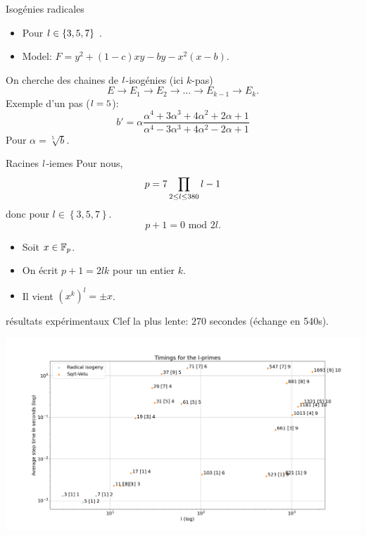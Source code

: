\documentclass{beamer}
\begin{document}
\begin{frame}{Isog\'enies radicales}
	\begin{itemize}
		\item Pour $\mathnormal{l}\in\left\{3, 5, 7\right\}$ .
		\item Model: $		F = y^2 + (1-c)xy - by - x^2(x-b)$.
	\end{itemize}
	On cherche des chaines de $\mathnormal{l}$-isog\'enies (ici $k$-pas)
\[
	E\rightarrow E_1\rightarrow E_2\rightarrow \dots\rightarrow E_{k-1}\rightarrow E_k.
\]
	Exemple d'un pas ($\mathnormal{l}=5$):
\[
	b' = \alpha\frac{\alpha^4 + 3\alpha^3 + 4\alpha^2 + 2\alpha + 1 }{\alpha^4 - 3\alpha^3 + 4\alpha^2 - 2\alpha + 1}
\]
	Pour $\alpha = \sqrt[5]{b}$.
\end{frame}

\begin{frame}[noframenumbering]{Racines $\mathnormal{l}$-iemes}
	Pour nous,
	\[
		p = 7\prod_{2\leq \mathnormal{l}\leq 380} \mathnormal{l} - 1
	\]
	donc pour $l\in\left\{3, 5, 7\right\}$.
	\[
		p + 1 = 0 \text{ mod }  2l.
	\]
	\begin{itemize}
		\item Soit $x\in\mathbb{F}_p$.
		\item On \'ecrit $p+1 = 2lk$ pour un entier $k$.
		\item Il vient $(x^k)^l = \pm x$.
	\end{itemize}
\end{frame}

\begin{frame}{résultats expérimentaux}
	Clef la plus lente: $270$ secondes (\'echange en 540s).
	\begin{center}
		\includegraphics[scale=0.22]{../figs/timings}
	\end{center}
\end{frame}
\end{document}
